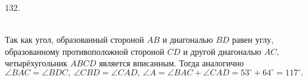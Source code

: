 132. \begin{figure}[ht!]
\end{figure}\\
Так как угол, образованный стороной $AB$ и диагональю $BD$ равен углу, образованному противоположной стороной $CD$ и другой диагональю $AC,$ четырёхугольник $ABCD$ является вписанным. Тогда аналогично $\angle BAC=\angle BDC,\ \angle CBD=\angle CAD,\ \angle A=\angle BAC+\angle CAD=53^\circ+64^\circ=117^\circ.$\\
